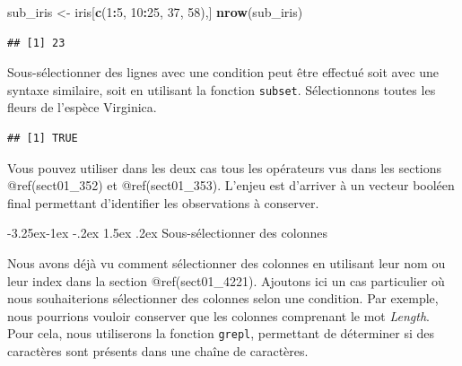 \documentclass[
  11pt,
  french,
]{book}
\makeatletter
\newenvironment{Shaded}{\begin{snugshade}}{\end{snugshade}}
\newcommand{\CommentTok}[1]{\textcolor[rgb]{0.56,0.35,0.01}{\textit{#1}}}
\newcommand{\DecValTok}[1]{\textcolor[rgb]{0.00,0.00,0.81}{#1}}
\newcommand{\KeywordTok}[1]{\textcolor[rgb]{0.13,0.29,0.53}{\textbf{#1}}}
\newcommand{\NormalTok}[1]{#1}
\newcommand{\OperatorTok}[1]{\textcolor[rgb]{0.81,0.36,0.00}{\textbf{#1}}}
\newcommand{\StringTok}[1]{\textcolor[rgb]{0.31,0.60,0.02}{#1}}
\newenvironment{kframe}{%
\medskip{}
\setlength{\fboxsep}{.8em}
 \def\at@end@of@kframe{}%
 \ifinner\ifhmode%
  \def\at@end@of@kframe{\end{minipage}}%
  \begin{minipage}{\columnwidth}%
 \fi\fi%
 \def\FrameCommand##1{\hskip\@totalleftmargin \hskip-\fboxsep
 \colorbox{shadecolor}{##1}\hskip-\fboxsep
     \hskip-\linewidth \hskip-\@totalleftmargin \hskip\columnwidth}%
 \MakeFramed {\advance\hsize-\width
   \@totalleftmargin\z@ \linewidth\hsize
   \@setminipage}}%
 {\par\unskip\endMakeFramed%
 \at@end@of@kframe}
\renewenvironment{Shaded}{\begin{kframe}}{\end{kframe}}
\renewcommand\paragraph{\@startsection{paragraph}{4}{\z@}%
   {-3.25ex\@plus -1ex \@minus -.2ex}%
   {1.5ex \@plus .2ex}%
   {\normalfont\normalsize\bfseries}}
\makeatother
\begin{document}
\begin{Shaded}
\begin{Highlighting}[]
\NormalTok{sub_iris <-}\StringTok{ }\NormalTok{iris[}\KeywordTok{c}\NormalTok{(}\DecValTok{1}\OperatorTok{:}\DecValTok{5}\NormalTok{, }\DecValTok{10}\OperatorTok{:}\DecValTok{25}\NormalTok{, }\DecValTok{37}\NormalTok{, }\DecValTok{58}\NormalTok{),]}
\KeywordTok{nrow}\NormalTok{(sub_iris)}
\end{Highlighting}
\end{Shaded}

\begin{verbatim}
## [1] 23
\end{verbatim}

Sous-sélectionner des lignes avec une condition peut être effectué soit avec une syntaxe similaire, soit en utilisant la fonction \texttt{subset}. Sélectionnons toutes les fleurs de l'espèce Virginica.

\begin{Shaded}
\end{Shaded}

\begin{verbatim}
## [1] TRUE
\end{verbatim}

Vous pouvez utiliser dans les deux cas tous les opérateurs vus dans les sections @ref(sect01\_352) et @ref(sect01\_353). L'enjeu est d'arriver à un vecteur booléen final permettant d'identifier les observations à conserver.

\hypertarget{sect014282}{%
\paragraph{Sous-sélectionner des colonnes}\label{sect014282}}

Nous avons déjà vu comment sélectionner des colonnes en utilisant leur nom ou leur index dans la section @ref(sect01\_4221). Ajoutons ici un cas particulier où nous souhaiterions sélectionner des colonnes selon une condition. Par exemple, nous pourrions vouloir conserver que les colonnes comprenant le mot \emph{Length}. Pour cela, nous utiliserons la fonction \texttt{grepl}, permettant de déterminer si des caractères sont présents dans une chaîne de caractères.
\end{document}
